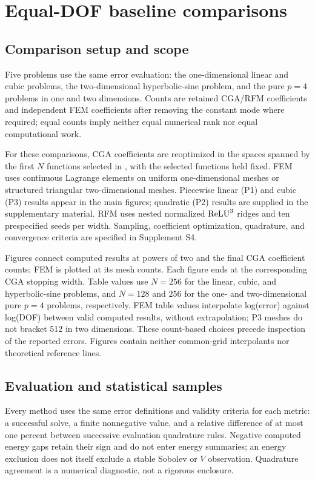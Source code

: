 \section{Equal-DOF baseline comparisons}
\label{sec:results}

\subsection{Comparison setup and scope}

Five problems use the same error evaluation: the one-dimensional linear and
cubic problems, the two-dimensional hyperbolic-sine problem, and the pure
\(p=4\) problems in one and two dimensions. Counts are
retained CGA/RFM coefficients and independent FEM coefficients after removing
the constant mode where required; equal counts imply neither equal numerical
rank nor equal computational work.

For these comparisons, CGA coefficients are reoptimized in the spaces spanned
by the first \(N\) functions selected in , with the selected
functions held fixed. FEM uses continuous Lagrange elements on uniform
one-dimensional meshes or structured triangular two-dimensional meshes.
Piecewise linear (P1) and cubic (P3) results appear in the main figures;
quadratic (P2) results are supplied in the supplementary material. RFM uses
nested normalized \(\operatorname{ReLU}^3\) ridges and ten prespecified seeds per width.
Sampling, coefficient optimization, quadrature, and convergence criteria
are specified in Supplement S4.

Figures connect computed results at powers of two and the final CGA coefficient
counts; FEM is plotted at its mesh counts. Each figure ends at the corresponding
CGA stopping width. Table values use \(N=256\) for the linear, cubic, and
hyperbolic-sine problems, and \(N=128\) and \(256\) for the one- and
two-dimensional pure \(p=4\) problems, respectively.
FEM table values interpolate log(error) against log(DOF) between valid computed results,
without extrapolation; P3 meshes do not bracket 512 in two dimensions.
These count-based choices precede inspection of the reported errors. Figures
contain neither common-grid interpolants nor theoretical reference lines.

\subsection{Evaluation and statistical samples}

Every method uses the same error definitions and validity criteria for each
metric: a successful solve, a finite nonnegative value, and a relative difference
of at most one percent between successive evaluation quadrature rules.
Negative computed energy gaps retain their sign and do not enter energy summaries;
an energy exclusion does not itself
exclude a stable Sobolev or \(V\) observation. Quadrature agreement is a
numerical diagnostic, not a rigorous enclosure.

